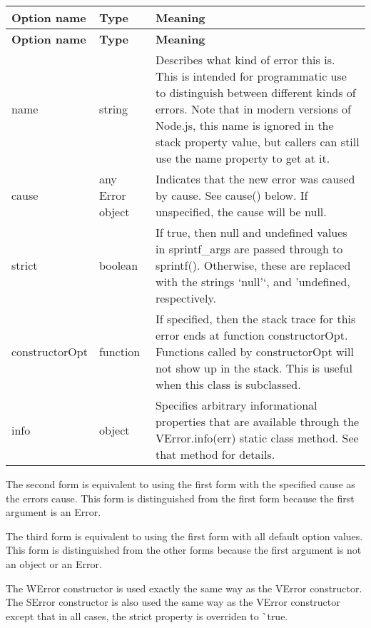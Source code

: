 \tabulinesep=1mm
\begin{longtabu} spread 0pt [c]{*{3}{|X[-1]}|}
\hline
\rowcolor{\tableheadbgcolor}\textbf{ Option name  }&\textbf{ Type  }&\textbf{ Meaning   }\\
\endfirsthead
\hline
\endfoot
\hline
\rowcolor{\tableheadbgcolor}\textbf{ Option name  }&\textbf{ Type  }&\textbf{ Meaning   }\\
\endhead
{\ttfamily name}  &string  &Describes what kind of error this is. This is intended for programmatic use to distinguish between different kinds of errors. Note that in modern versions of Node.\+js, this name is ignored in the {\ttfamily stack} property value, but callers can still use the {\ttfamily name} property to get at it.   \\
{\ttfamily cause}  &any Error object  &Indicates that the new error was caused by {\ttfamily cause}. See {\ttfamily cause()} below. If unspecified, the cause will be {\ttfamily null}.   \\
{\ttfamily strict}  &boolean  &If true, then {\ttfamily null} and {\ttfamily undefined} values in {\ttfamily sprintf\+\_\+args} are passed through to {\ttfamily sprintf()}. Otherwise, these are replaced with the strings `\textquotesingle{}null'`, and '{\ttfamily undefined}\textquotesingle{}, respectively.   \\
{\ttfamily constructor\+Opt}  &function  &If specified, then the stack trace for this error ends at function {\ttfamily constructor\+Opt}. Functions called by {\ttfamily constructor\+Opt} will not show up in the stack. This is useful when this class is subclassed.   \\
{\ttfamily info}  &object  &Specifies arbitrary informational properties that are available through the {\ttfamily V\+Error.\+info(err)} static class method. See that method for details.   \\
\end{longtabu}


The second form is equivalent to using the first form with the specified {\ttfamily cause} as the error\textquotesingle{}s cause. This form is distinguished from the first form because the first argument is an Error.

The third form is equivalent to using the first form with all default option values. This form is distinguished from the other forms because the first argument is not an object or an Error.

The {\ttfamily W\+Error} constructor is used exactly the same way as the {\ttfamily V\+Error} constructor. The {\ttfamily S\+Error} constructor is also used the same way as the {\ttfamily V\+Error} constructor except that in all cases, the {\ttfamily strict} property is overriden to \`{}true.

